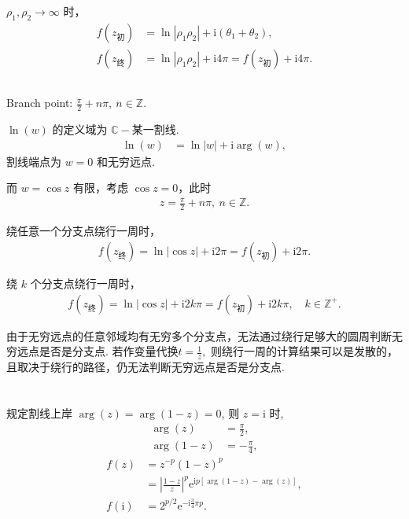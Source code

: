 \documentclass[12pt]{article}
\begin{document}
\(\rho_1,\rho_2\to\infty\) 时，
\begin{align*}
f(z_{\text{初}}) &= \ln|\rho_1\rho_2| + \mathrm{i}(\theta_1+\theta_2), \\
f(z_{\text{终}}) &= \ln|\rho_1\rho_2| + \mathrm{i}4\pi = f(z_{\text{初}}) + \mathrm{i}4\pi.
\end{align*}
\subsection{}
Branch point: \(\frac{\pi}{2} + n\pi,\ n\in\mathbb{Z}\).

\(\ln(w)\) 的定义域为 \(\mathbb{C} - \text{某一割线}\).
\begin{align*}
\ln(w) &= \ln|w| + \mathrm{i}\arg(w),
\end{align*}
割线端点为 \(w=0\) 和无穷远点.

而 \(w=\cos z\) 有限，考虑 \(\cos z=0\)，此时
\begin{align*}
z = \frac{\pi}{2} + n\pi,\ n\in\mathbb{Z}.
\end{align*}

绕任意一个分支点绕行一周时，
\begin{align*}
f(z_{\text{终}}) = \ln|\cos z| + \mathrm{i}2\pi = f(z_{\text{初}}) + \mathrm{i}2\pi.
\end{align*}

绕 \(k\) 个分支点绕行一周时，
\begin{align*}
f(z_{\text{终}}) = \ln|\cos z| + \mathrm{i}2k\pi = f(z_{\text{初}}) + \mathrm{i}2k\pi,\quad k\in\mathbb{Z}^+.
\end{align*}

由于无穷远点的任意邻域均有无穷多个分支点，无法通过绕行足够大的圆周判断无穷远点是否是分支点. 若作变量代换\(t=\frac{1}{z},\) 则绕行一周的计算结果可以是发散的，且取决于绕行的路径，仍无法判断无穷远点是否是分支点.
\section{}
规定割线上岸 \(\arg(z) = \arg(1-z) = 0\),
则 \(z = \mathrm{i}\) 时,
\begin{align*}
\arg(z) &= \frac{\pi}{2}, \\
\arg(1-z) &= -\frac{\pi}{4}, 
\end{align*}
\begin{align*}
f(z) &= z^{-p}(1-z)^p \\
&= \left| \frac{1-z}{z} \right|^p \mathrm{e}^{\mathrm{i} p \left[ \arg(1-z) - \arg(z) \right]}, \\
f(\mathrm{i}) &= 2^{p/2} \mathrm{e}^{-\mathrm{i} \frac{3}{4} \pi p}.
\end{align*}
\end{document}
